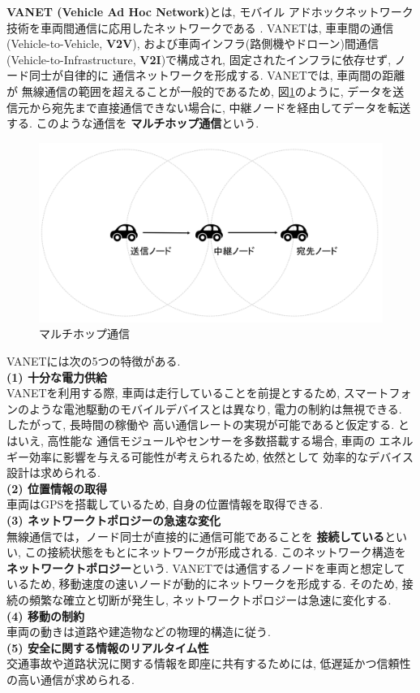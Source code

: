 \textbf{VANET (Vehicle Ad Hoc Network)}とは, モバイル
アドホックネットワーク技術を車両間通信に応用したネットワークである
\cite{adhoc,vanet}. VANETは, 車車間の通信(Vehicle-to-Vehicle, 
\textbf{V2V}), および車両インフラ(路側機やドローン)間通信
(Vehicle-to-Infrastructure, \textbf{V2I})\cite{drone}で構成され, 
固定されたインフラに依存せず, ノード同士が自律的に
通信ネットワークを形成する. VANETでは, 車両間の距離が
無線通信の範囲を超えることが一般的であるため, 図\ref{fig:vanet}のように, 
データを送信元から宛先まで直接通信できない場合に, 
中継ノードを経由してデータを転送する. このような通信を
\textbf{マルチホップ通信}という.

\begin{figure}
  \centering
  \includegraphics[scale=0.6]{figures/vanet.png}
  \caption{マルチホップ通信}
  \label{fig:vanet}
\end{figure}

VANETには次の5つの特徴がある.\\[0.5em]
\noindent\textbf{(1) 十分な電力供給}\\
\indent VANETを利用する際, 車両は走行していることを前提とするため, 
スマートフォンのような電池駆動のモバイルデバイスとは異なり, 
電力の制約は無視できる. したがって, 長時間の稼働や
高い通信レートの実現が可能であると仮定する. とはいえ, 高性能な
通信モジュールやセンサーを多数搭載する場合, 車両の
エネルギー効率に影響を与える可能性が考えられるため, 依然として
効率的なデバイス設計は求められる.\\[1em]
\noindent\textbf{(2) 位置情報の取得}\\
\indent 車両はGPSを搭載しているため, 自身の位置情報を取得できる.\\[1em]
\noindent\textbf{(3) ネットワークトポロジーの急速な変化}\\
\indent 無線通信では，ノード同士が直接的に通信可能であることを
\textbf{接続している}といい, この接続状態をもとにネットワークが形成される. 
このネットワーク構造を\textbf{ネットワークトポロジー}という. 
VANETでは通信するノードを車両と想定しているため, 
移動速度の速いノードが動的にネットワークを形成する. 
そのため, 接続の頻繁な確立と切断が発生し, 
ネットワークトポロジーは急速に変化する. \\[1em]
\noindent\textbf{(4) 移動の制約}\\
\indent 車両の動きは道路や建造物などの物理的構造に従う.\\[1em]
\noindent\textbf{(5) 安全に関する情報のリアルタイム性}\\
\indent 交通事故や道路状況に関する情報を即座に共有するためには, 
低遅延かつ信頼性の高い通信が求められる.\\

